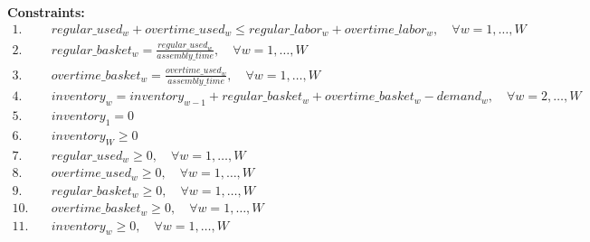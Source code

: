 \documentclass{article}
\begin{document}
\textbf{Constraints:}
\begin{align*}
1. & \quad regular\_used_{w} + overtime\_used_{w} \leq regular\_labor_{w} + overtime\_labor_{w}, \quad \forall w = 1, \ldots, W \\
2. & \quad regular\_basket_{w} = \frac{regular\_used_{w}}{assembly\_time}, \quad \forall w = 1, \ldots, W \\
3. & \quad overtime\_basket_{w} = \frac{overtime\_used_{w}}{assembly\_time}, \quad \forall w = 1, \ldots, W \\
4. & \quad inventory_{w} = inventory_{w-1} + regular\_basket_{w} + overtime\_basket_{w} - demand_{w}, \quad \forall w = 2, \ldots, W \\
5. & \quad inventory_{1} = 0 \\
6. & \quad inventory_{W} \geq 0 \\
7. & \quad regular\_used_{w} \geq 0, \quad \forall w = 1, \ldots, W \\
8. & \quad overtime\_used_{w} \geq 0, \quad \forall w = 1, \ldots, W \\
9. & \quad regular\_basket_{w} \geq 0, \quad \forall w = 1, \ldots, W \\
10. & \quad overtime\_basket_{w} \geq 0, \quad \forall w = 1, \ldots, W \\
11. & \quad inventory_{w} \geq 0, \quad \forall w = 1, \ldots, W
\end{align*}
\end{document}
